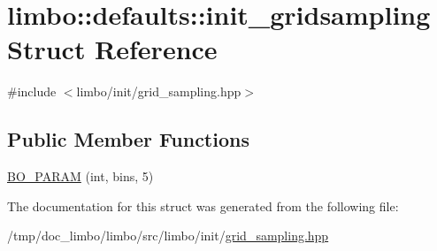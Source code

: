 \hypertarget{structlimbo_1_1defaults_1_1init__gridsampling}{}\section{limbo\+:\+:defaults\+:\+:init\+\_\+gridsampling Struct Reference}
\label{structlimbo_1_1defaults_1_1init__gridsampling}


{\ttfamily \#include $<$limbo/init/grid\+\_\+sampling.\+hpp$>$}

\subsection*{Public Member Functions}
\begin{DoxyCompactItemize}
\item 
\hyperlink{group__init__defaults_ga4f3f478d00343baf0a0d3d0f227bf9db}{B\+O\+\_\+\+P\+A\+R\+A\+M} (int, bins, 5)
\end{DoxyCompactItemize}


The documentation for this struct was generated from the following file\+:\begin{DoxyCompactItemize}
\item 
/tmp/doc\+\_\+limbo/limbo/src/limbo/init/\hyperlink{grid__sampling_8hpp}{grid\+\_\+sampling.\+hpp}\end{DoxyCompactItemize}
